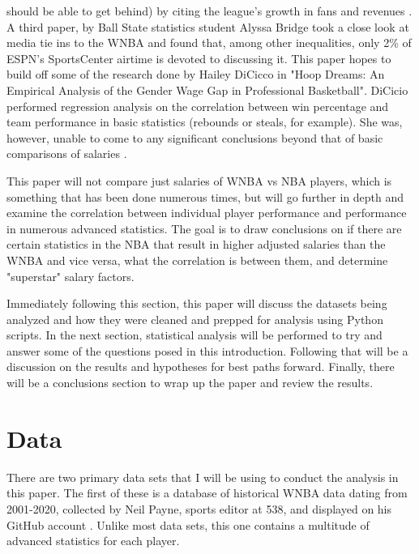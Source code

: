 \documentclass[12pt]{article}
\begin{document}
should be able to get behind) by citing the league's growth in fans and revenues \citep{ettienne2019s}. A third paper, by Ball State statistics student 
Alyssa Bridge took a close look at media tie ins to the WNBA and found that, among other inequalities, only 2\% of ESPN’s SportsCenter airtime is devoted 
to discussing it. \citep{Bridge}
This paper hopes to build off some of the research done by Hailey DiCicco in "Hoop Dreams: An Empirical Analysis of the Gender Wage Gap in Professional 
Basketball". DiCicio performed regression analysis on the correlation between win percentage and team performance in basic statistics (rebounds or steals, 
for example). She was, however, unable to come to any significant conclusions beyond that of basic comparisons of salaries \citep{Hoop_Dreams}.
\par
This paper will not compare just salaries of WNBA vs NBA players, which is something that has been done numerous times, but will go further in depth and 
examine the correlation between individual player performance and performance in numerous advanced statistics. The goal is to draw conclusions on if there 
are certain statistics in the NBA that result in higher adjusted salaries than the WNBA and vice versa, what the correlation is between them, and 
determine "superstar" salary factors.
\par
Immediately following this section, this paper will discuss the datasets being analyzed and how they were cleaned and prepped for analysis using Python 
scripts. In the next section, statistical analysis will be performed to try and answer some of the questions posed in this introduction. Following that 
will be a discussion on the results and hypotheses for best paths forward. Finally, there will be a conclusions section to wrap up the paper and review 
the results.


\section{Data}
There are two primary data sets that I will be using to conduct the analysis in this paper. The first of these is a database of historical WNBA data 
dating from 2001-2020, collected by Neil Payne, sports editor at 538, and displayed on his GitHub account \citep{first}. Unlike most data sets, this one 
contains a multitude of advanced statistics for each player.
\end{document}
